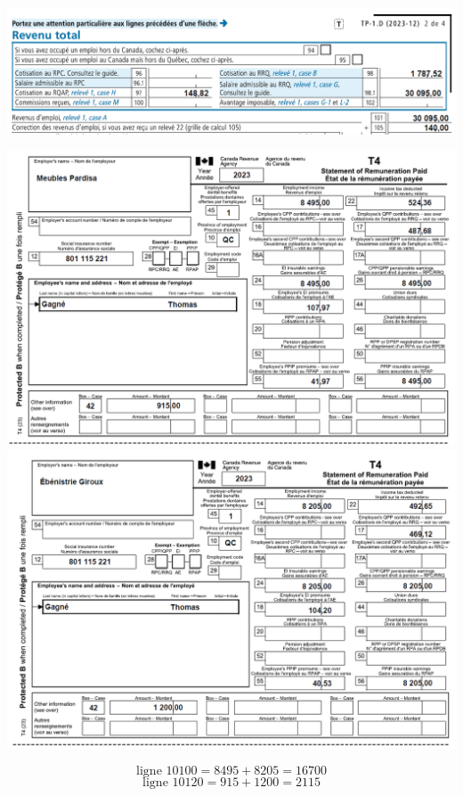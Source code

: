 \noindent
\includegraphics[width=\textwidth]{exercice/2-6/Q1/b-TP1-reponse.png}

\begin{question}
	
	
	\begin{center}
		\includegraphics[width=.97\textwidth]{exercice/2-6/Q2/T4-1.png}
		\includegraphics[width=.97\textwidth]{exercice/2-6/Q2/T4-2.png}
	\end{center}
\end{question}
\[ \text{ligne~10100} = 8495 + 8205 = 16700\]
\[ \text{ligne~10120} = 915 + 1200 = 2115\]

